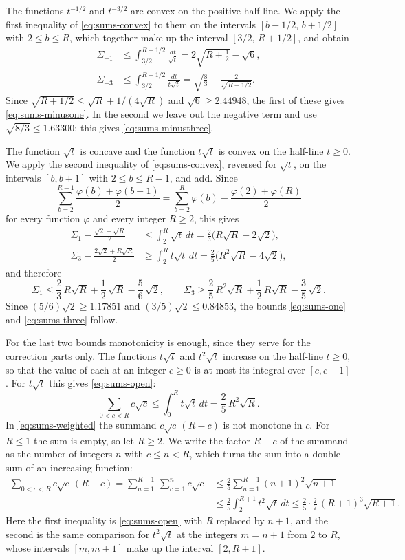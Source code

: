 \documentclass{amsart}
\theoremstyle{definition}
\theoremstyle{remark}
\numberwithin{equation}{section}
\begin{document}
The functions $t^{-1/2}$ and $t^{-3/2}$ are convex on the positive
half-line. We apply the first inequality of \eqref{eq:sums-convex} to them
on the intervals $[b-1/2,\,b+1/2]$ with $2\le b\le R$, which together make
up the interval $[3/2,\,R+1/2]$, and obtain
\begin{align*}
\Sigma_{-1}&\le\int_{3/2}^{R+1/2}\frac{dt}{\sqrt t}
=2\sqrt{R+\frac12}-\sqrt6,\\
\Sigma_{-3}&\le\int_{3/2}^{R+1/2}\frac{dt}{t\sqrt t}
=\sqrt{\frac83}-\frac2{\sqrt{R+1/2}}.
\end{align*}
Since $\sqrt{R+1/2}\le\sqrt R+1/(4\sqrt R)$ and $\sqrt6\ge2.44948$, the
first of these gives \eqref{eq:sums-minusone}. In the second we leave out
the negative term and use $\sqrt{8/3}\le1.63300$; this gives
\eqref{eq:sums-minusthree}.

The function $\sqrt t$ is concave and the function $t\sqrt t$ is convex on
the half-line $t\ge0$. We apply the second inequality of
\eqref{eq:sums-convex}, reversed for $\sqrt t$, on the intervals $[b,b+1]$
with $2\le b\le R-1$, and add. Since
\[
\sum_{b=2}^{R-1}\frac{\varphi(b)+\varphi(b+1)}2
=\sum_{b=2}^{R}\varphi(b)-\frac{\varphi(2)+\varphi(R)}2
\]
for every function $\varphi$ and every integer $R\ge2$, this gives
\begin{align*}
\Sigma_1-\frac{\sqrt2+\sqrt R}2&\le\int_2^R\sqrt t\,dt
=\frac23\bigl(R\sqrt R-2\sqrt2\bigr),\\
\Sigma_3-\frac{2\sqrt2+R\sqrt R}2&\ge\int_2^Rt\sqrt t\,dt
=\frac25\bigl(R^2\sqrt R-4\sqrt2\bigr),
\end{align*}
and therefore
\[
\Sigma_1\le\frac23\,R\sqrt R+\frac12\,\sqrt R-\frac56\,\sqrt2,\qquad
\Sigma_3\ge\frac25\,R^2\sqrt R+\frac12\,R\sqrt R-\frac35\,\sqrt2 .
\]
Since $(5/6)\sqrt2\ge1.17851$ and $(3/5)\sqrt2\le0.84853$, the
bounds \eqref{eq:sums-one} and \eqref{eq:sums-three} follow.

For the last two bounds monotonicity is enough, since they serve for the
correction parts only. The functions $t\sqrt t$ and $t^2\sqrt t$ increase on
the half-line $t\ge0$, so that the value of each at an integer $c\ge0$ is at
most its integral over $[c,c+1]$. For $t\sqrt t$ this gives
\eqref{eq:sums-open}:
\[
\sum_{0<c<R}c\sqrt c\le\int_0^{R}t\sqrt t\,dt=\frac25\,R^2\sqrt R .
\]
In \eqref{eq:sums-weighted} the summand $c\sqrt c\,(R-c)$ is not monotone in
$c$. For $R\le1$ the sum is empty, so let $R\ge2$. We write the factor $R-c$
of the summand as the number of integers $n$ with $c\le n<R$, which turns the
sum into a double sum of an increasing function:
\begin{align*}
\sum_{0<c<R}c\sqrt c\,(R-c)=\sum_{n=1}^{R-1}\,\sum_{c=1}^{n}c\sqrt c
&\le\frac25\sum_{n=1}^{R-1}(n+1)^2\sqrt{n+1}\\
&\le\frac25\int_2^{R+1}t^2\sqrt t\,dt
\le\frac25\cdot\frac27\,(R+1)^3\sqrt{R+1}.
\end{align*}
Here the first inequality is \eqref{eq:sums-open} with $R$ replaced by
$n+1$, and the second is the same comparison for $t^2\sqrt t$ at the
integers $m=n+1$ from $2$ to $R$, whose intervals $[m,m+1]$ make up the
interval $[2,R+1]$.
\end{document}
